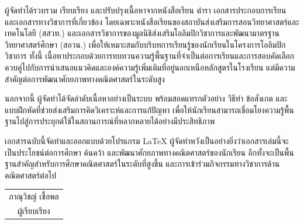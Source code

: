 \documentclass[a4paper,oneside,12pt]{book}
\begin{document}
ผู้จัดทำได้รวบรวม เรียบเรียง และปรับปรุงเนื้อหาจากหนังสือเรียน ตำรา เอกสารประกอบการเรียน และเอกสารทางวิชาการที่เกี่ยวข้อง โดยเฉพาะหนังสือเรียนของสถาบันส่งเสริมการสอนวิทยาศาสตร์และเทคโนโลยี (สสวท.) และเอกสารวิชาการของมูลนิธิส่งเสริมโอลิมปิกวิชาการและพัฒนามาตรฐานวิทยาศาสตร์ศึกษา (สอวน.) เพื่อให้เหมาะสมกับบริบทการเรียนรู้ของนักเรียนในโครงการโอลิมปิกวิชาการ ทั้งนี้ เนื้อหาประกอบด้วยการทบทวนความรู้พื้นฐานที่จำเป็นต่อการเรียนและการสอบคัดเลือก ควบคู่ไปกับการนำเสนอแนวคิดและองค์ความรู้เพิ่มเติมที่อยู่นอกเหนือหลักสูตรในโรงเรียน แต่มีความสำคัญต่อการพัฒนาศักยภาพทางคณิตศาสตร์ในระดับสูง

นอกจากนี้ ผู้จัดทำได้จัดลำดับเนื้อหาอย่างเป็นระบบ พร้อมสอดแทรกตัวอย่าง วิธีทำ ข้อสังเกต และแบบฝึกหัดที่ช่วยส่งเสริมการคิดวิเคราะห์และการแก้ปัญหา เพื่อให้นักเรียนสามารถเชื่อมโยงความรู้พื้นฐานไปสู่การประยุกต์ใช้ในสถานการณ์ที่หลากหลายได้อย่างมีประสิทธิภาพ

เอกสารฉบับนี้จัดทำและออกแบบด้วยโปรแกรม \LaTeX{} ผู้จัดทำหวังเป็นอย่างยิ่งว่าเอกสารเล่มนี้จะเป็นประโยชน์ต่อการศึกษา ค้นคว้า และพัฒนาศักยภาพทางคณิตศาสตร์ของนักเรียน อีกทั้งจะเป็นพื้นฐานสำคัญสำหรับการศึกษาคณิตศาสตร์ในระดับที่สูงขึ้น และการเข้าร่วมกิจกรรมทางวิชาการด้านคณิตศาสตร์ต่อไป

\vspace{1.5cm}

\begin{flushright}
	\begin{tabular}{c}
		ภาณุวิชญ์ เชื้อพล\\
		ผู้เรียบเรียง
	\end{tabular}
\end{flushright}


	\frontmatter
	\tableofcontents
	\clearpage
	
\mainmatter
\cleardoublepage
 
\cleardoublepage

\cleardoublepage

\cleardoublepage


\clearpage


\begingroup

\setcounter{chapter}{0}
\end{document}
